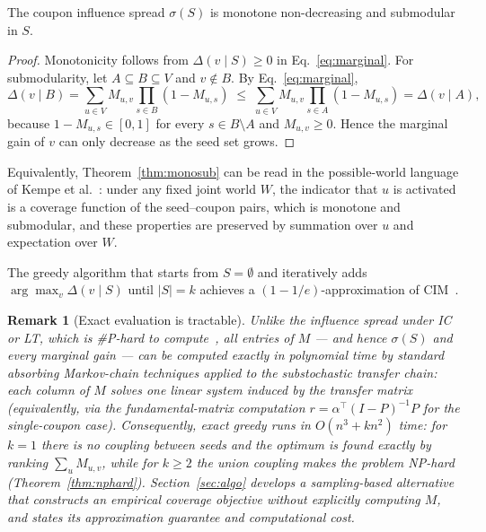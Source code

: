 \documentclass[sigconf]{acmart}
\newtheorem{remark}{Remark}[section]
\begin{document}
\begin{theorem}
\label{thm:monosub}
The coupon influence spread $\sigma(S)$ is monotone non-decreasing
and submodular in $S$.
\end{theorem}

\begin{proof}
Monotonicity follows from $\Delta(v\mid S)\ge 0$ in
Eq.~\eqref{eq:marginal}.
For submodularity, let $A\subseteq B\subseteq V$ and $v\notin B$.
By Eq.~\eqref{eq:marginal},
\[
\Delta(v\mid B)
=
\sum_{u\in V}M_{u,v}\prod_{s\in B}(1-M_{u,s})
\;\le\;
\sum_{u\in V}M_{u,v}\prod_{s\in A}(1-M_{u,s})
=
\Delta(v\mid A),
\]
because $1-M_{u,s}\in[0,1]$ for every $s\in B\setminus A$ and
$M_{u,v}\ge 0$.
Hence the marginal gain of $v$ can only decrease as the seed set
grows.
\end{proof}

Equivalently, Theorem~\ref{thm:monosub} can be read in the
possible-world language of Kempe et al.~\cite{kempe2003maximizing}:
under any fixed joint world $W$, the indicator that $u$ is activated
is a coverage function of the seed--coupon pairs, which is monotone
and submodular, and these properties are preserved by summation over
$u$ and expectation over $W$.

\begin{corollary}
\label{cor:greedy}
The greedy algorithm that starts from $S=\emptyset$ and iteratively
adds $\arg\max_{v}\Delta(v\mid S)$ until $|S|=k$ achieves a
$(1-1/e)$-approximation of CIM~\cite{nemhauser1978analysis}.
\end{corollary}

\begin{remark}[Exact evaluation is tractable]
\label{rem:tractable-eval}
Unlike the influence spread under IC or LT, which is
\#P-hard to compute~\cite{chen2010scalable}, all entries of $M$ ---
and hence $\sigma(S)$ and every marginal gain --- can be computed
\emph{exactly} in polynomial time by standard absorbing Markov-chain
techniques applied to the substochastic transfer chain: each column
of $M$ solves one linear system induced by the transfer matrix
(equivalently, via the fundamental-matrix computation
$r=\alpha^{\top}(I-P)^{-1}P$ for the single-coupon case).
Consequently, exact greedy runs in $O(n^3+kn^2)$ time: for $k=1$
there is no coupling between seeds and the optimum is found exactly
by ranking $\sum_{u}M_{u,v}$, while for $k\ge 2$ the union coupling
makes the problem NP-hard (Theorem~\ref{thm:nphard}).
Section~\ref{sec:algo} develops a sampling-based alternative that
constructs an empirical coverage objective without explicitly computing
$M$, and states its approximation guarantee and computational cost.
\end{remark}
\end{document}
